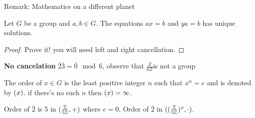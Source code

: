 Remark: Mathematics on a different planet

\begin{prop}
	Let $G$ be a group and $a,b \in G $. The equations $ax = b$ and $ ya = b$ has unique solutions.
\end{prop}
\begin{proof}
	Prove it! you will need left and right cancellation.
\end{proof}
\begin{example}
	\textbf{No cancelation } $ \bar{2} \bar{3} = \bar{0} \mod{6} $, observe that $ \frac{Z}{6Z} $is not a group 
\end{example}

\begin{define}
	The order of $ x \in G$ is the least positive integer $n$ such that $x^n = e$ and is denoted by $ \left( x \right) $. if there's no such $n$ then $\left( x \right) = \infty$.
	
\end{define}

\begin{example}
	Order of $ \bar{2} $ is 5 in $ (\frac{\mathbb{Z}}{5 \mathbb{Z}}, +) $ where $ e = 0 $, Order of $\bar{2}$ in $((\frac{\mathbb{Z}}{5 \mathbb{Z}})^x, \cdot) $.
\end{example}

